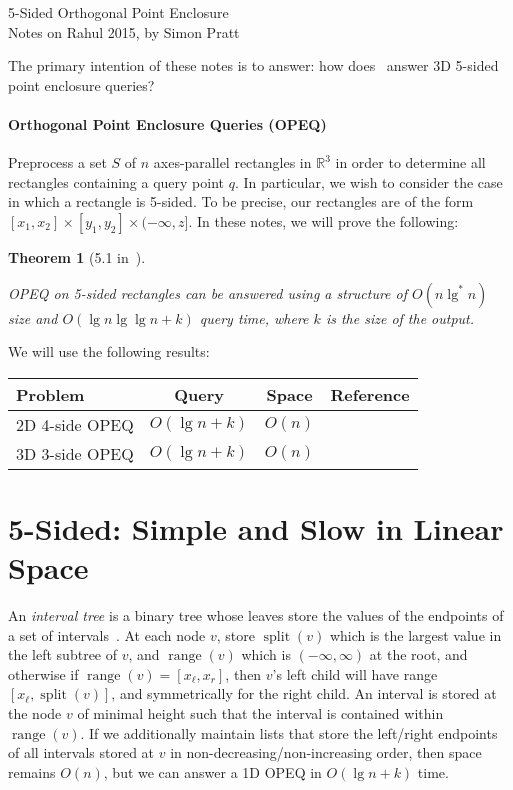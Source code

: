\documentclass[letterpaper,12pt,twocolumn]{article}
\DeclareMathOperator{\splt}{split}
\DeclareMathOperator{\range}{range}
\newcommand{\BigOh}[1]{O\!\left(#1\right)}
\newcommand\IR{\mathbb{R}}
\newcommand\bounds[1]{[#1]}
\newcommand\lbounds[1]{(#1]} %
\theoremstyle{plain}
\newtheorem{theorem}{Theorem}
\begin{document}
{\noindent\Large 5-Sided Orthogonal Point Enclosure}\\
{\noindent Notes on Rahul 2015, by Simon Pratt}

The primary intention of these notes is to answer: how
does~\cite{saladi2015improved} answer 3D 5-sided point enclosure
queries?

\paragraph{Orthogonal Point Enclosure Queries (OPEQ)}
Preprocess a set $S$ of $n$ axes-parallel rectangles in $\IR^3$ in
order to determine all rectangles containing a query point $q$.  In
particular, we wish to consider the case in which a rectangle is
5-sided.  To be precise, our rectangles are of the form
$\bounds{x_1,x_2} \times \bounds{y_1, y_2} \times
\lbounds{-\infty,z}$.  In these notes, we will prove the following:

\begin{theorem}[5.1 in~\cite{saladi2015improved}]\label{thm:51}

  OPEQ on 5-sided rectangles can be answered using a structure of
  $\BigOh{n\lg^* n}$ size and $\BigOh{\lg n \lg\lg n + k}$ query time,
  where $k$ is the size of the output.

\end{theorem}

We will use the following results:

\noindent\begin{tabular}{lccr}
    \toprule
    Problem & Query & Space & Reference \\
    \midrule
    2D 4-side OPEQ & $\BigOh{\lg n + k}$ & $\BigOh{n}$ & \cite{chazelle1986filtering} \\ %
    3D 3-side OPEQ & $\BigOh{\lg n + k}$ & $\BigOh{n}$ & \cite{afshani2008dominance} \\ %
    \bottomrule
\end{tabular}

\section{5-Sided: Simple and Slow in Linear Space}

An \emph{interval tree} is a binary tree whose leaves store the values
of the endpoints of a set of intervals~\cite{edelsbrunner1983new}.  At
each node $v$, store $\splt(v)$ which is the largest value in the left
subtree of $v$, and $\range(v)$ which is $(-\infty,\infty)$ at the
root, and otherwise if $\range(v) = [x_\ell, x_r]$, then $v$'s left
child will have range $[x_\ell, \splt(v)]$, and symmetrically for the
right child.  An interval is stored at the node $v$ of minimal height
such that the interval is contained within $\range(v)$.  If we
additionally maintain lists that store the left/right endpoints of all
intervals stored at $v$ in non-decreasing/non-increasing order, then
space remains $\BigOh{n}$, but we can answer a 1D OPEQ in $\BigOh{\lg
  n + k}$ time.
\end{document}
